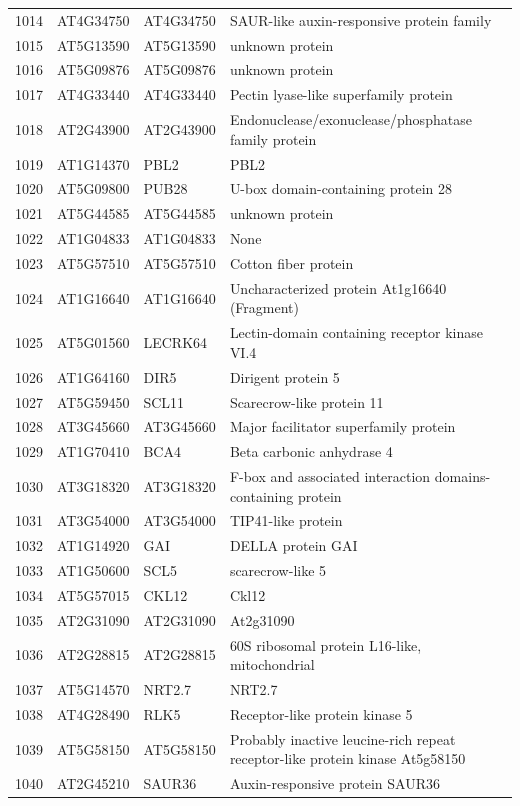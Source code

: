 \documentclass[11pt]{article}
\begin{document}
\begin{center}
\begin{tabular}{rlll}
1014 & AT4G34750 & AT4G34750 & SAUR-like auxin-responsive protein family\\
1015 & AT5G13590 & AT5G13590 & unknown protein\\
1016 & AT5G09876 & AT5G09876 & unknown protein\\
1017 & AT4G33440 & AT4G33440 & Pectin lyase-like superfamily protein\\
1018 & AT2G43900 & AT2G43900 & Endonuclease/exonuclease/phosphatase family protein\\
1019 & AT1G14370 & PBL2 & PBL2\\
1020 & AT5G09800 & PUB28 & U-box domain-containing protein 28\\
1021 & AT5G44585 & AT5G44585 & unknown protein\\
1022 & AT1G04833 & AT1G04833 & None\\
1023 & AT5G57510 & AT5G57510 & Cotton fiber protein\\
1024 & AT1G16640 & AT1G16640 & Uncharacterized protein At1g16640 (Fragment)\\
1025 & AT5G01560 & LECRK64 & Lectin-domain containing receptor kinase VI.4\\
1026 & AT1G64160 & DIR5 & Dirigent protein 5\\
1027 & AT5G59450 & SCL11 & Scarecrow-like protein 11\\
1028 & AT3G45660 & AT3G45660 & Major facilitator superfamily protein\\
1029 & AT1G70410 & BCA4 & Beta carbonic anhydrase 4\\
1030 & AT3G18320 & AT3G18320 & F-box and associated interaction domains-containing protein\\
1031 & AT3G54000 & AT3G54000 & TIP41-like protein\\
1032 & AT1G14920 & GAI & DELLA protein GAI\\
1033 & AT1G50600 & SCL5 & scarecrow-like 5\\
1034 & AT5G57015 & CKL12 & Ckl12\\
1035 & AT2G31090 & AT2G31090 & At2g31090\\
1036 & AT2G28815 & AT2G28815 & 60S ribosomal protein L16-like, mitochondrial\\
1037 & AT5G14570 & NRT2.7 & NRT2.7\\
1038 & AT4G28490 & RLK5 & Receptor-like protein kinase 5\\
1039 & AT5G58150 & AT5G58150 & Probably inactive leucine-rich repeat receptor-like protein kinase At5g58150\\
1040 & AT2G45210 & SAUR36 & Auxin-responsive protein SAUR36\\

\end{tabular}
\end{center}
\end{document}
